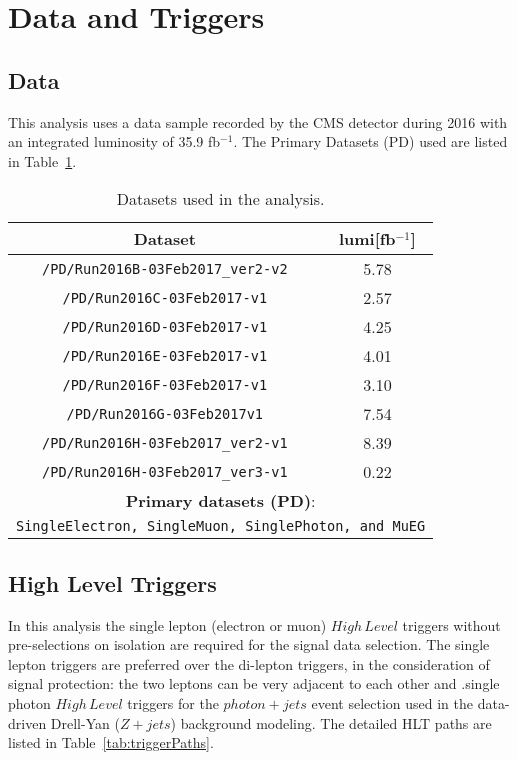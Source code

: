 \section{Data and Triggers}
\subsection{Data}
This analysis uses a data sample recorded by the CMS detector during 2016 with an integrated luminosity of 35.9 fb$^{-1}$. The Primary Datasets (PD) used are listed in Table~\ref{tab:samples_data}. 
\begin{table}[htbp]
\begin{small}
  \begin{center}
    \caption{Datasets used in the analysis. \label{tab:samples_data}}
    \begin{tabular}{c c}
      \hline\hline
      Dataset & lumi[fb$^{-1}$]  \\
      \hline
      \texttt{/PD/Run2016B-03Feb2017\_ver2-v2} &  5.78\\
      \texttt{/PD/Run2016C-03Feb2017-v1} &  2.57 \\
      \texttt{/PD/Run2016D-03Feb2017-v1} &  4.25 \\
      \texttt{/PD/Run2016E-03Feb2017-v1} &  4.01 \\
      \texttt{/PD/Run2016F-03Feb2017-v1} &  3.10 \\
      \texttt{/PD/Run2016G-03Feb2017v1}  &  7.54\\
      \texttt{/PD/Run2016H-03Feb2017\_ver2-v1} &  8.39 \\
      \texttt{/PD/Run2016H-03Feb2017\_ver3-v1} &  0.22 \\
      \hline
      \multicolumn{2}{c}{\textbf{Primary datasets (PD)}:} \\
      \multicolumn{2}{c}{\texttt{SingleElectron, SingleMuon, SinglePhoton, and MuEG}}\\ \hline
      \hline\hline
    \end{tabular}
  \end{center}
\end{small}
\end{table}

\subsection{High Level Triggers}\label{sec:samples_hlt}
In this analysis the single lepton (electron or muon) $High\,Level$ triggers without pre-selections on isolation are required for the signal data selection. The single lepton triggers are preferred over the di-lepton triggers, in the consideration of signal protection: the two leptons can be very adjacent to each other and .single photon $High\,Level$ triggers for the $photon+jets$ event selection used in the data-driven Drell-Yan ($Z+jets$) background modeling. The detailed HLT paths are listed in Table~\ref{tab:triggerPaths}. 

